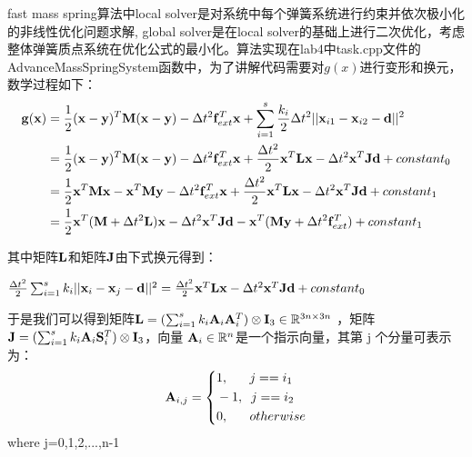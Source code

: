 \documentclass[]{ctexart}
\begin{document}
fast mass spring算法中local solver是对系统中每个弹簧系统进行约束并依次极小化的非线性优化问题求解,
global solver是在local solver的基础上进行二次优化，考虑整体弹簧质点系统在优化公式的最小化。算法实现在lab4中task.cpp文件的
AdvanceMassSpringSystem函数中，为了讲解代码需要对$g(x)$进行变形和换元，数学过程如下：
 \begin{equation} \begin{aligned} \bold{g}(\bold{x})
	 &= \frac{1}{2}(\bold{x}-\bold{y})^{T}\bold{M}(\bold{x}-\bold{y}) - \Delta t^2 \bold{f}_{ext}^{T} 
	 \bold{x} + \sum_{i=1}^{s}\frac{k_i}{2}\Delta t^2||\bold{x}_{i1} - \bold{x}_{i2} - \bold{d}||^{2} 
	 \\ &=\frac{1}{2}(\bold{x}-\bold{y})^{T}\bold{M}(\bold{x}-\bold{y}) - \Delta t^2 \bold{f}_{ext}^{T} 
	 \bold{x} + \frac{\Delta t^2}{2}\bold{x}^{T}\bold{L}\bold{x} - \Delta t^2\bold{x}^{T}\bold{J}\bold{d} + constant_0 
	 \\ &= \frac{1}{2}\bold{x}^{T}\bold{M}\bold{x}-\bold{x}^{T}\bold{M}\bold{y} - \Delta t^2 \bold{f}_{ext}^{T}\bold{x} 
	 + \frac{\Delta t^2}{2}\bold{x}^{T}\bold{L}\bold{x}- \Delta t^2\bold{x}^{T}\bold{J}\bold{d} + constant_1 
	 \\ &=\frac{1}{2}\bold{x}^{T}(\bold{M}+\Delta t^2\bold{L})\bold{x} - \Delta t^2\bold{x}^{T}\bold{J}\bold{d} -
	  \bold{x}^{T}(\bold{M}\bold{y} + \Delta t^2\bold{f}_{ext}^{T}) + constant_1 \end{aligned} \end{equation}

	  其中矩阵$\bold{L}$和矩阵$\bold{J}$由下式换元得到：

	  $\frac{\Delta t^2}{2}\sum_{i=1}^{s}k_i||\bold{x}_i - \bold{x}_j - \bold{d}||^2
	   = \frac{\Delta t^2}{2}\bold{x}^{T}\bold{L}\bold{x}-\Delta t^2\bold{x}^{T}\bold{J}\bold{d} + constant_0 $

	   于是我们可以得到矩阵$ \bold{L} = (\sum_{i=1}^{s} k_i\bold{A}_i\bold{A}_i^{T}) \otimes 
	   \bold{I}_3 \in \mathbb{R}^{3n \times 3n}$ ，矩阵 $\bold{J} = (\sum_{i=1}^{s}k_i\bold{A}_i\bold{S}_i^{T}) 
	   \otimes \bold{I}_3 $，向量 $\bold{A}_i \in \mathbb{R}^{n} $是一个指示向量，其第 j 个分量可表示为：
\begin{equation} \bold{A}_{i,j}=\left\{ \begin{aligned} &1, \;\;\;\;\;\;
	 j==i_1 \\ &-1, \;\;j==i_2\\ &0, \;\;\;\;\;\; otherwise \end{aligned} \right. 
	\end{equation} where \; j=0,1,2,...,n-1
\end{document}
